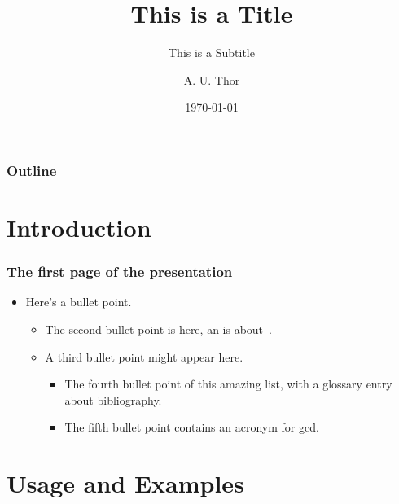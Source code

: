 \documentclass[american,aspectratio=169]{beamer}
\title{This is a Title}
\subtitle[Short Subtitle]{This is a Subtitle}
\author{A. U. Thor}
\institute[USN]{\USN \\ \FacultyTNM \\ \DepartmentSIS}
\date{\today}
\begin{document}
\usntitlepage

\section[Outline]{}


\begin{frame}
	\frametitle{Outline}
	\tableofcontents
\end{frame}

\section{Introduction}

\begin{frame}
	\frametitle{The first page of the presentation}
	\begin{itemize}
		\item Here's a bullet point.
			\begin{itemize}
				\item The \alert{second bullet} point is here, an is
					about~\textcite{claerbout1991scrutiny}.
				\item A third bullet point might appear here.
					\begin{itemize}
						\item The fourth bullet point of this amazing list, with
							a glossary entry about \gls{bibliography}.
						\item The fifth bullet point contains an acronym for \gls{gcd}.
					\end{itemize}
			\end{itemize}
	\end{itemize}
\end{frame}

\section{Usage and Examples}
\end{document}
